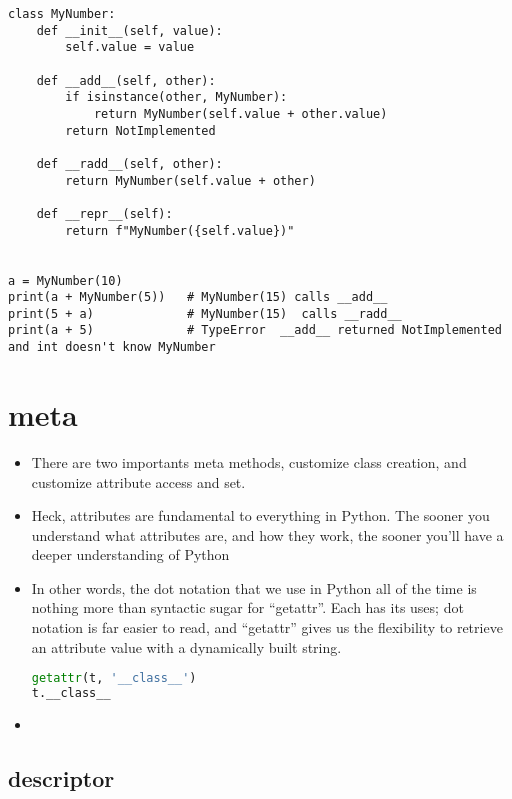 \documentclass[a4paper,12pt,twoside]{book}
\begin{document}
\begin{lstlisting}
class MyNumber:
	def __init__(self, value):
		self.value = value
	
	def __add__(self, other):
		if isinstance(other, MyNumber):
			return MyNumber(self.value + other.value)
		return NotImplemented
	
	def __radd__(self, other):
		return MyNumber(self.value + other)
	
	def __repr__(self):
		return f"MyNumber({self.value})"


a = MyNumber(10)
print(a + MyNumber(5))   # MyNumber(15) calls __add__
print(5 + a)             # MyNumber(15)  calls __radd__
print(a + 5)             # TypeError  __add__ returned NotImplemented and int doesn't know MyNumber
\end{lstlisting}





\chapter{meta}
\begin{itemize}
	\item There are two importants meta methods, customize class creation, and customize attribute access and set. 
	\item Heck, attributes are fundamental to everything in Python. The sooner you understand what attributes are, and how they work, the sooner you’ll have a deeper understanding of Python
	\item In other words, the dot notation that we use in Python all of the time is nothing more than syntactic sugar for “getattr”. Each has its uses; dot notation is far easier to read, and “getattr” gives us the flexibility to retrieve an attribute value with a dynamically built string.
\begin{lstlisting}[frame=single, language=python]
getattr(t, '__class__')
t.__class__
\end{lstlisting} 
	\item 
	
\end{itemize}
\section{descriptor}
\end{document}
